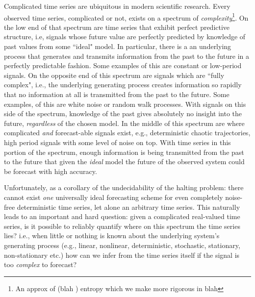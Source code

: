 Complicated time series are ubiquitous in modern scientific research. 
Every observed time series, complicated or not, exists on a spectrum of \emph{complexity}\footnote{An approx of (blah ) entropy which we make more rigorous in blah}. On the low end of that spectrum are time series that exhibit perfect predictive structure, i.e, signals whose future value are perfectly predicted by knowledge of past values from some ``ideal" model. In particular, there is a an underlying process that generates and transmits information from the past to the future in a perfectly predictable fashion. Some examples of this are constant or low-period signals. On the opposite end of this spectrum are signals which are ``fully complex", i.e., the underlying generating process creates information so rapidly that no information at all is transmitted from the past to the future. Some examples, of this are white noise or random walk processes. With signals on this side of the spectrum, knowledge of the past gives absolutely no insight into the future, \emph{regardless} of the chosen model.  In the middle of this spectrum are where complicated \emph{and} forecast-able signals exist, e.g., deterministic chaotic trajectories, high period signals with some level of noise on top. With time series in this portion of the spectrum, enough information is being transmitted from the past to the future that given the \emph{ideal} model the future of the observed system could be forecast with high accuracy. 

Unfortunately, as a corollary of the undecidability of the halting problem: there cannot exist \emph{one} universally ideal forecasting scheme for even completely noise-free deterministic time series\cite{sfi-prediction}, let alone an arbitrary time series. This naturally leads to an important and hard question: given a complicated real-valued time series, is it possible to reliably quantify where on this spectrum the time series lies? i.e., when little or nothing is known about the underlying system's generating process (e.g., linear, nonlinear, deterministic, stochastic, stationary, non-stationary etc.) how can we infer from the time series itself if the signal is too \emph{complex} to forecast?



